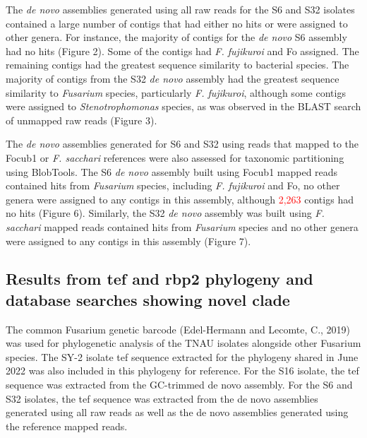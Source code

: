 The \textit{de novo} assemblies generated using all raw reads for the S6 and S32 isolates contained a large number of contigs that had either no hits or were assigned to other genera. For instance, the majority of contigs for the \textit{de novo} S6 assembly had no hits (Figure 2). Some of the contigs had \textit{F. fujikuroi} and \ac{Fo} assigned. The remaining contigs had the greatest sequence similarity to bacterial species. The majority of contigs from the S32 \textit{de novo} assembly had the greatest sequence similarity to \textit{Fusarium} species, particularly \textit{F. fujikuroi}, although some contigs were assigned to \textit{Stenotrophomonas} species, as was observed in the BLAST search of unmapped raw reads (Figure 3). 

The \textit{de novo} assemblies generated for S6 and S32 using reads that mapped to the \ac{Focub1} or \textit{F. sacchari} references were also assessed for taxonomic partitioning using BlobTools. The S6 \textit{de novo} assembly built using \ac{Focub1} mapped reads contained hits from \textit{Fusarium} species, including \textit{F. fujikuroi} and \ac{Fo}, no other genera were assigned to any contigs in this assembly, although \textcolor{red}{2,263} contigs had no hits (Figure 6).  Similarly, the S32 \textit{de novo} assembly was built using \textit{F. sacchari} mapped reads contained hits from \textit{Fusarium} species and no other genera were assigned to any contigs in this assembly (Figure 7). 
 
\subsection{Results from \acf{tef} and \acf{rbp2} phylogeny and database searches showing novel clade}

The common Fusarium genetic barcode (Edel-Hermann and Lecomte, C., 2019) was used for phylogenetic analysis of the TNAU isolates alongside other Fusarium species. The SY-2 isolate \ac{tef} sequence extracted for the phylogeny shared in June 2022 was also included in this phylogeny for reference. For the S16 isolate, the \ac{tef} sequence was extracted from the GC-trimmed de novo assembly. For the S6 and S32 isolates, the \ac{tef} sequence was extracted from the de novo assemblies generated using all raw reads as well as the de novo assemblies generated using the reference mapped reads. 

